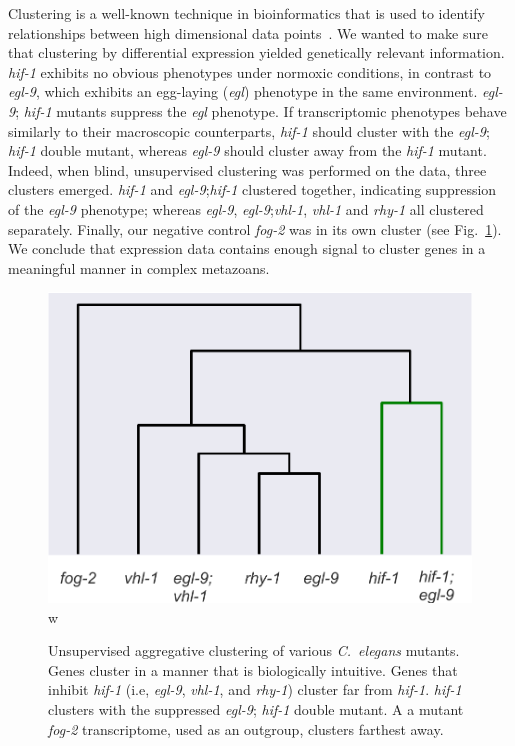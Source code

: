 \documentclass[9pt,twocolumn,twoside]{pnas-new}
\newcommand{\cel}{\emph{C.~elegans}}
\newcommand{\egl}{\emph{egl-9}}
\newcommand{\rhy}{\emph{rhy-1}}
\newcommand{\vhl}{\emph{vhl-1}}
\newcommand{\hif}{\emph{hif-1}}
\newcommand{\fog}{\emph{fog-2}}
\begin{document}
Clustering is a well-known technique in bioinformatics that is used to identify
relationships between high dimensional data points~\cite{Yeung2003}. We wanted
to make sure that clustering by differential expression yielded genetically
relevant information. \hif{} exhibits no obvious phenotypes under normoxic
conditions, in contrast to \egl{}, which exhibits an egg-laying (\emph{egl})
phenotype in the same environment. \egl{}; \hif{} mutants suppress the
\emph{egl} phenotype. If transcriptomic phenotypes behave similarly to their
macroscopic counterparts, \hif{} should cluster with the \egl{}; \hif{} double
mutant, whereas \egl{} should cluster away from the \hif{} mutant.
Indeed, when blind, unsupervised clustering was performed on the data, three
clusters emerged. \hif{} and \egl{};\hif{} clustered together, indicating
suppression of the \egl{} phenotype; whereas \egl{}, \egl{};\vhl{}, \vhl{} and
\rhy{} all clustered separately. Finally, our negative control \fog{} was in its
own cluster (see Fig.~\ref{fig:dendrogram}). We conclude that expression data
contains enough signal to cluster genes in a meaningful manner in complex
metazoans.

\begin{figure}%
\centering
\includegraphics[width=0.75\linewidth]{figs/dendrogram.pdf}w
\caption{
Unsupervised aggregative clustering of various \cel{} mutants. Genes
cluster in a manner that is biologically intuitive. Genes that inhibit \hif{}
(i.e, \egl{}, \vhl{}, and \rhy{}) cluster far from \hif{}. \hif{} clusters with
the suppressed \egl{}; \hif{} double mutant. A a mutant \fog{} transcriptome,
used as an outgroup, clusters farthest away.
}
\label{fig:dendrogram}
\end{figure}
\end{document}
